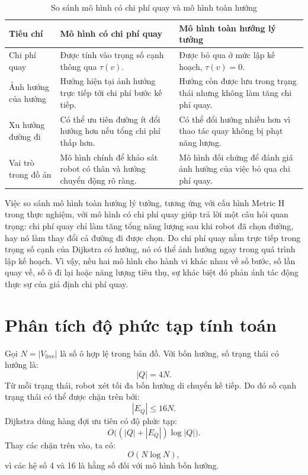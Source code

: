 \documentclass[../DoAn.tex]{subfiles}
\begin{document}
\begin{table}[!htbp]
\centering
\caption{So sánh mô hình có chi phí quay và mô hình toàn hướng}
\small
\setlength{\tabcolsep}{4pt}
\renewcommand{\arraystretch}{1.05}
\begin{tabular}{|L{0.25\textwidth}|L{0.32\textwidth}|L{0.33\textwidth}|}
\hline
\textbf{Tiêu chí} & \textbf{Mô hình có chi phí quay} & \textbf{Mô hình toàn hướng lý tưởng} \\
\hline
Chi phí quay & Được tính vào trọng số cạnh thông qua $\tau(v)$. & Được bỏ qua ở mức lập kế hoạch, $\tau(v)=0$. \\
\hline
Ảnh hưởng của hướng & Hướng hiện tại ảnh hưởng trực tiếp tới chi phí bước kế tiếp. & Hướng còn được lưu trong trạng thái nhưng không làm tăng chi phí quay. \\
\hline
Xu hướng đường đi & Có thể ưu tiên đường ít đổi hướng hơn nếu tổng chi phí thấp hơn. & Có thể đổi hướng nhiều hơn vì thao tác quay không bị phạt năng lượng. \\
\hline
Vai trò trong đồ án & Mô hình chính để khảo sát robot có thân và hướng chuyển động rõ ràng. & Mô hình đối chứng để đánh giá ảnh hưởng của việc bỏ qua chi phí quay. \\
\hline
\end{tabular}\end{table}

Việc so sánh mô hình toàn hướng lý tưởng, tương ứng với cấu hình Metric H trong thực nghiệm, với mô hình có chi phí quay giúp trả lời một câu hỏi quan trọng: chi phí quay chỉ làm tăng tổng năng lượng sau khi robot đã chọn đường, hay nó làm thay đổi cả đường đi được chọn. Do chi phí quay nằm trực tiếp trong trọng số cạnh của Dijkstra có hướng, nó có thể ảnh hưởng ngay trong quá trình lập kế hoạch. Vì vậy, nếu hai mô hình cho hành vi khác nhau về số bước, số lần quay về, số ô đi lại hoặc năng lượng tiêu thụ, sự khác biệt đó phản ánh tác động thực sự của giả định chi phí quay.

\section{Phân tích độ phức tạp tính toán}

Gọi $N=|V_{\text{free}}|$ là số ô hợp lệ trong bản đồ. Với bốn hướng, số trạng thái có hướng là:
\begin{equation}
|Q|=4N.
\end{equation}
Từ mỗi trạng thái, robot xét tối đa bốn hướng di chuyển kế tiếp. Do đó số cạnh trạng thái có thể được chặn trên bởi:
\begin{equation}
|E_Q|\le 16N.
\end{equation}
Dijkstra dùng hàng đợi ưu tiên có độ phức tạp:
\begin{equation}
O\bigl((|Q|+|E_Q|)\log |Q|\bigr).
\end{equation}
Thay các chặn trên vào, ta có:
\begin{equation}
O(N\log N),
\end{equation}
vì các hệ số 4 và 16 là hằng số đối với mô hình bốn hướng.
\end{document}
